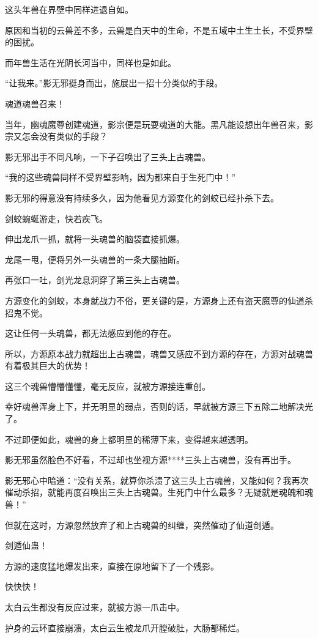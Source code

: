 \begin{this_body}
这头年兽在界壁中同样进退自如。

原因和当初的云兽差不多，云兽是白天中的生命，不是五域中土生土长，不受界壁的困扰。

而年兽生活在光阴长河当中，同样也是如此。

“让我来。”影无邪挺身而出，施展出一招十分类似的手段。

魂道魂兽召来！

当年，幽魂魔尊创建魂道，影宗便是玩耍魂道的大能。黑凡能设想出年兽召来，影宗又怎会没有类似的手段？

影无邪出手不同凡响，一下子召唤出了三头上古魂兽。

“我的这些魂兽同样不受界壁影响，因为都来自于生死门中！”

影无邪的得意没有持续多久，因为他看见方源变化的剑蛟已经扑杀下去。

剑蛟蜿蜒游走，快若疾飞。

伸出龙爪一抓，就将一头魂兽的脑袋直接抓爆。

龙尾一甩，便将另外一头魂兽的一条大腿抽断。

再张口一吐，剑光龙息洞穿了第三头上古魂兽。

方源变化的剑蛟，本身就战力不俗，更关键的是，方源身上还有盗天魔尊的仙道杀招鬼不觉。

这让任何一头魂兽，都无法感应到他的存在。

所以，方源原本战力就超出上古魂兽，魂兽又感应不到方源的存在，方源对战魂兽有着极其巨大的优势！

这三个魂兽懵懵懂懂，毫无反应，就被方源接连重创。

幸好魂兽浑身上下，并无明显的弱点，否则的话，早就被方源三下五除二地解决光了。

不过即便如此，魂兽的身上都明显的稀薄下来，变得越来越透明。

影无邪虽然脸色不好看，不过却也坐视方源****三头上古魂兽，没有再出手。

影无邪心中暗道：“没有关系，就算你杀溃了这三头上古魂兽，又能如何？我再次催动杀招，就能再度召唤出三头上古魂兽。生死门中什么最多？无疑就是魂魄和魂兽！”

但就在这时，方源忽然放弃了和上古魂兽的纠缠，突然催动了仙道剑遁。

剑遁仙蛊！

方源的速度猛地爆发出来，直接在原地留下了一个残影。

快快快！

太白云生都没有反应过来，就被方源一爪击中。

护身的云环直接崩溃，太白云生被龙爪开膛破肚，大肠都稀烂。


\end{this_body}
